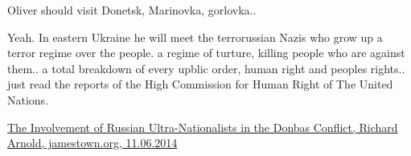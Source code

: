 \begin{itemize}
\begin{itemize}
Oliver should visit Donetsk, Marinovka, gorlovka..


Yeah. In eastern Ukraine he will meet the terrorussian Nazis who grow up a
terror regime over the people. a regime of turture, killing people who are
against them.. a total breakdown of every upblic order, human right and peoples
rights..  just read the reports of the High Commission for Human Right of The
United Nations.

\href{https://jamestown.org/program/the-involvement-of-russian-ultra-nationalists-in-the-donbas-conflict/}{%
The Involvement of Russian Ultra-Nationalists in the Donbas Conflict, %
Richard Arnold, jamestown.org, 11.06.2014%
}

\end{itemize} %

\end{itemize} %
